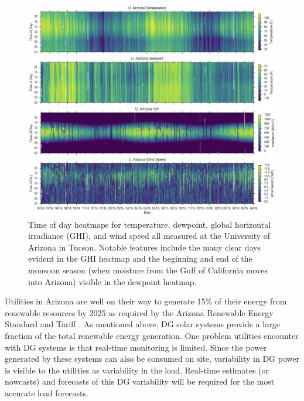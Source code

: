 \begin{figure}[p]
\centering
\includegraphics[width=\textwidth]{figs/ua_heat.png}
\caption[Heatmaps of temperature, dewpoint, irradiance, and wind
speed]{Time of day heatmaps for temperature, dewpoint, global
  horizontal irradiance (GHI), and wind speed all measured at the
  University of Arizona in Tucson. Notable features include the many
  clear days evident in the GHI heatmap and the beginning and end of the
  monsoon season (when moisture from the Gulf of California moves into
  Arizona) visible in the dewpoint heatmap.}
\label{fig:ua_heatmap}
\end{figure}

Utilities in Arizona are well on their way to generate 15\% of their
energy from renewable resources by 2025 as required by the Arizona
Renewable Energy Standard and Tariff \citep{rest}.
As mentioned above, DG solar systems provide a large fraction of the
total renewable energy generation.
One problem utilities encounter with DG systems is that real-time
monitoring is limited.
Since the power generated by these systems can also be consumed on
site, variability in DG power is visible to the utilities as
variability in the load.
Real-time estimates (or nowcasts) and forecasts of this DG variability
will be required for the most accurate load forecasts.

